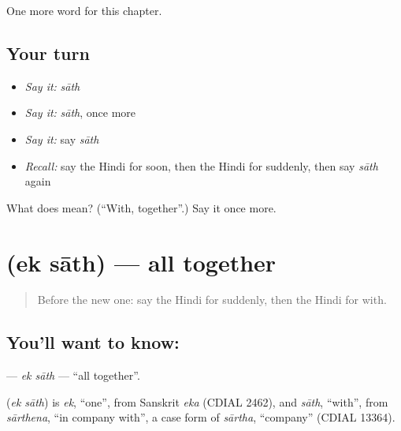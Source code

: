 \begin{grammarlens}[title={What you've built}]
One more word for this chapter.
\end{grammarlens}

\subsection*{Your turn}
\begin{itemize}
\raggedright
  \item \emph{Say it:} \emph{sāth}
  \item \emph{Say it:} \emph{sāth}, once more
  \item \emph{Say it:} say \emph{sāth}
  \item \emph{Recall:} say the Hindi for soon, then the Hindi for suddenly, then say \emph{sāth} again
\end{itemize}

\begin{tcolorbox}[breakable,colback=teal!4,colframe=teal!35!black,title={Before you move on}]
What does  mean? (\textquotedblleft{}With, together\textquotedblright{}.) Say it once more.
\end{tcolorbox}
\section[\texorpdfstring{\hi{एक} \hi{साथ} (ek sāth)}{एक साथ (ek sāth)}]{  (ek sāth) — all together}

\label{lesson:HI-C249-eksath}



\begin{quote}
Before the new one: say the Hindi for suddenly, then the Hindi for with.
\end{quote}

\subsection*{You'll want to know:  }
\textbf{ } — \emph{ek sāth} — \textquotedblleft{}all together\textquotedblright{}.

\begin{cousinweb}
\textbf{ } (\emph{ek sāth}) is \emph{ek}, \textquotedblleft{}one\textquotedblright{}, from Sanskrit \emph{eka} (CDIAL 2462), and \emph{sāth}, \textquotedblleft{}with\textquotedblright{}, from \emph{sārthena}, \textquotedblleft{}in company with\textquotedblright{}, a case form of \emph{sārtha}, \textquotedblleft{}company\textquotedblright{} (CDIAL 13364).
\end{cousinweb}

